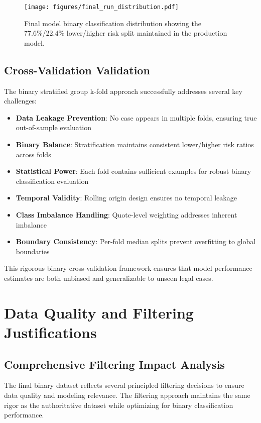 \documentclass[11pt,a4paper]{article}
\begin{document}
\begin{figure}[H]
\centering
\texttt{[image: figures/final\_run\_distribution.pdf]}
\caption{Final model binary classification distribution showing the 77.6\%/22.4\% lower/higher risk split maintained in the production model.}
\end{figure}

\subsection{Cross-Validation Validation}

The binary stratified group k-fold approach successfully addresses several key challenges:

\begin{itemize}
\item \textbf{Data Leakage Prevention}: No case appears in multiple folds, ensuring true out-of-sample evaluation
\item \textbf{Binary Balance}: Stratification maintains consistent lower/higher risk ratios across folds
\item \textbf{Statistical Power}: Each fold contains sufficient examples for robust binary classification evaluation
\item \textbf{Temporal Validity}: Rolling origin design ensures no temporal leakage
\item \textbf{Class Imbalance Handling}: Quote-level weighting addresses inherent imbalance
\item \textbf{Boundary Consistency}: Per-fold median splits prevent overfitting to global boundaries
\end{itemize}

This rigorous binary cross-validation framework ensures that model performance estimates are both unbiased and generalizable to unseen legal cases.

\section{Data Quality and Filtering Justifications}

\subsection{Comprehensive Filtering Impact Analysis}

The final binary dataset reflects several principled filtering decisions to ensure data quality and modeling relevance. The filtering approach maintains the same rigor as the authoritative dataset while optimizing for binary classification performance.
\end{document}
